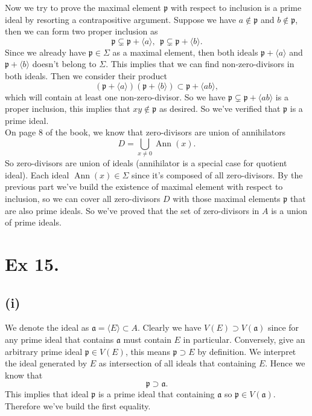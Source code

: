 Now we try to prove the maximal element $\mathfrak p$ with respect to inclusion is a prime ideal by resorting a contrapositive argument.
Suppose we have $a\notin \mathfrak p$ and $b\notin\mathfrak p$, then we can form two proper inclusion as
$$\mathfrak p\subsetneq \mathfrak p+\langle a\rangle,~~ \mathfrak p\subsetneq \mathfrak p+\langle b\rangle.$$
Since we already have $\mathfrak p\in\Sigma$ as a maximal element, then both ideals $\mathfrak p+\langle a\rangle$ and $\mathfrak p+\langle b\rangle$ doesn't belong to $\Sigma$. This implies that we can find non-zero-divisors in both ideals. Then we consider their product
$$(\mathfrak p+\langle a\rangle)(\mathfrak p+\langle b\rangle)\subset \mathfrak p+\langle ab\rangle,$$ which will contain at least one non-zero-divisor. So we have $\mathfrak p\subsetneq\mathfrak p+\langle ab\rangle$ is a proper inclusion, this implies that $xy\notin \mathfrak p$ as desired. So we've verified that $\mathfrak p$ is a prime ideal.\\

On page 8 of the book, we know that zero-divisors are union of annihilators 
$$D=\bigcup_{x\neq 0} \operatorname{Ann}(x).$$ So zero-divisors are union of ideals (annihilator is a special case for quotient ideal). Each ideal $\operatorname{Ann}(x)\in \Sigma$ since it's composed of all zero-divisors. By the previous part we've build the existence of maximal element with respect to inclusion, so we can cover all zero-divisors $D$ with those maximal elements $\mathfrak p$ that are also prime ideals. So we've proved that the set of zero-divisors in $A$ is a union of prime ideals.



\section{Ex 15.}

\subsection{(i)}

We denote the ideal as $\mathfrak a=\langle E\rangle \subset A$.
Clearly we have $V(E)\supset V(\mathfrak a)$ since for any prime ideal that contains $\mathfrak a$ must contain $E$ in particular. Conversely, give an arbitrary prime ideal $\mathfrak p\in V(E)$, this means $\mathfrak p\supset E$ by definition. We interpret the ideal generated by $E$ as intersection of all ideals that containing $E$. Hence we know that 
$$\mathfrak p\supset \mathfrak a.$$ This implies that ideal $\mathfrak p$ is a prime ideal that containing $\mathfrak a$ so $\mathfrak p\in V(\mathfrak a)$. Therefore we've build the first equality.\\

